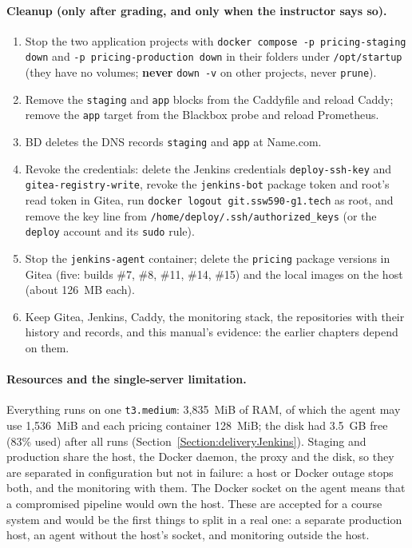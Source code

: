 \paragraph{Cleanup (only after grading, and only when the instructor says so).}
\begin{enumerate}
\item Stop the two application projects with \texttt{docker compose -p pricing-staging down} and \texttt{-p pricing-production down} in their folders under \texttt{/opt/startup} (they have no volumes; \textbf{never} \texttt{down -v} on other projects, never \texttt{prune}).
\item Remove the \texttt{staging} and \texttt{app} blocks from the Caddyfile and reload Caddy; remove the \texttt{app} target from the Blackbox probe and reload Prometheus.
\item BD deletes the DNS records \texttt{staging} and \texttt{app} at Name.com.
\item Revoke the credentials: delete the Jenkins credentials \texttt{deploy-ssh-key} and \texttt{gitea-registry-write}, revoke the \texttt{jenkins-bot} package token and root's read token in Gitea, run \texttt{docker logout git.ssw590-g1.tech} as root, and remove the key line from \texttt{/home/deploy/.ssh/authorized\_keys} (or the \texttt{deploy} account and its \texttt{sudo} rule).
\item Stop the \texttt{jenkins-agent} container; delete the \texttt{pricing} package versions in Gitea (five: builds \#7, \#8, \#11, \#14, \#15) and the local images on the host (about 126~MB each).
\item Keep Gitea, Jenkins, Caddy, the monitoring stack, the repositories with their history and records, and this manual's evidence: the earlier chapters depend on them.
\end{enumerate}

\paragraph{Resources and the single-server limitation.} Everything runs on one \texttt{t3.medium}: 3,835~MiB of RAM, of which the agent may use 1,536~MiB and each pricing container 128~MiB; the disk had 3.5~GB free (83\% used) after all runs (Section~\ref{Section:deliveryJenkins}).
Staging and production share the host, the Docker daemon, the proxy and the disk, so they are separated in configuration but not in failure: a host or Docker outage stops both, and the monitoring with them. The Docker socket on the agent means that a compromised
pipeline would own the host. These are accepted for a course system and would be the first things to split in a real one: a separate production host, an agent without the host's socket, and monitoring outside the host.

